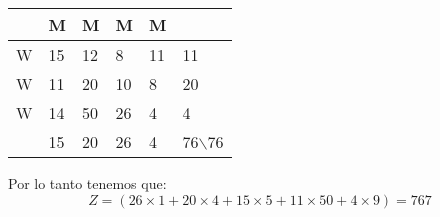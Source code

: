 \documentclass{article}
\begin{document}
\begin{center}

\begin{tabular}{|l|l|l|l|l|l|}
\hline
 & M & M & M & M &  \\ \hline
W & \cellcolor[HTML]{FD6864}15 & \cellcolor[HTML]{34FF34}12 & \cellcolor[HTML]{34FF34}8 & \cellcolor[HTML]{FD6864}11 & 11 \\ \hline
W & \cellcolor[HTML]{34FF34}11 & \cellcolor[HTML]{FD6864}20 & \cellcolor[HTML]{FD6864}10 & \cellcolor[HTML]{34FF34}8 & 20 \\ \hline
W & \cellcolor[HTML]{34FF34}14 & \cellcolor[HTML]{34FF34}50 & \cellcolor[HTML]{FD6864}26 & \cellcolor[HTML]{FD6864}4 & 4 \\ \hline
 & 15 & 20 & 26 & 4 & 76$\backslash$76 \\ \hline
\end{tabular}

\end{center}

Por lo tanto tenemos que:
$$Z=(26 \times 1 + 20 \times 4 + 15 \times 5 + 11 \times 50 + 4 \times 9)=767$$
\end{document}
